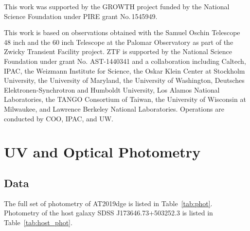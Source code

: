 \documentclass[twocolumn]{aastex63}
\begin{document}
\begin{CJK*}{UTF8}{gbsn}
This work was supported by the GROWTH project funded by the National Science Foundation under 
PIRE grant No.\,1545949. 

This work is based on observations obtained with the Samuel Oschin Telescope 48 inch and the 60 
inch Telescope at the Palomar Observatory as part of the Zwicky Transient Facility project. ZTF is 
supported by the National Science Foundation under grant No. AST-1440341 and a collaboration 
including Caltech, IPAC, the Weizmann Institute for Science, the Oskar Klein Center at Stockholm 
University, the University of Maryland, the University of Washington, Deutsches 
Elektronen-Synchrotron and Humboldt University, Los Alamos National Laboratories, the TANGO 
Consortium of Taiwan, the University of Wisconsin at Milwaukee, and Lawrence Berkeley National 
Laboratories. Operations are conducted by COO, IPAC, and UW. 



\clearpage
\appendix

\section{UV and Optical Photometry} \label{sec:appphot}
\subsection{Data}\label{subsec:appphot_data}


The full set of photometry of AT2019dge is listed in Table~\ref{tab:phot}. Photometry of the host 
galaxy SDSS J173646.73+503252.3 is listed in Table~\ref{tab:host_phot}.


\end{CJK*}
\end{document}
